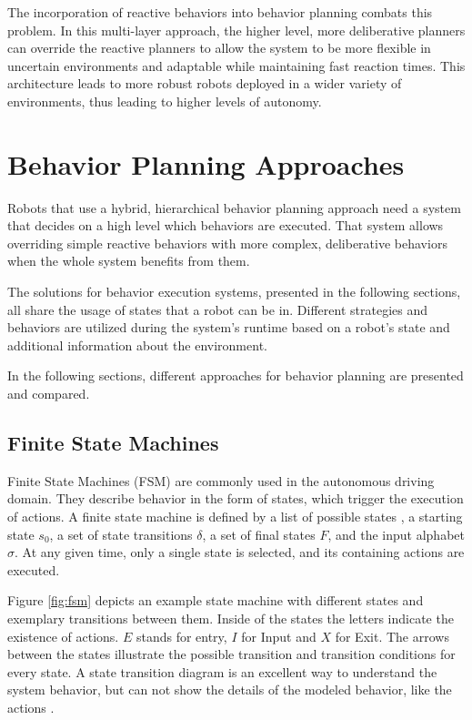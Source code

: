 The incorporation of reactive behaviors into behavior planning combats this problem. In this multi-layer approach, the higher level, more deliberative planners can override the reactive planners to allow the system to be more flexible in uncertain environments and adaptable while maintaining fast reaction times. This architecture leads to more robust robots deployed in a wider variety of environments, thus leading to higher levels of autonomy.

\section{Behavior Planning Approaches}
\label{sec:Behavior Planning Approaches}

Robots that use a hybrid, hierarchical behavior planning approach need a system that decides on a high level which behaviors are executed. That system allows overriding simple reactive behaviors with more complex, deliberative behaviors when the whole system benefits from them. 

The solutions for behavior execution systems, presented in the following sections, all share the usage of states that a robot can be in. Different strategies and behaviors are utilized during the system's runtime based on a robot's state and additional information about the environment. 
 
In the following sections, different approaches for behavior planning are presented and compared.

\subsection{Finite State Machines}

Finite State Machines (FSM) are commonly used in the autonomous driving domain. They describe behavior in the form of states, which trigger the execution of actions. A finite state machine is defined by a list of possible states \textit{}, a starting state $s_{0}$, a set of state transitions $\delta$, a set of final states $F$, and the input alphabet $\sigma$. At any given time, only a single state is selected, and its containing actions are executed. 

Figure \ref{fig:fsm} depicts an example state machine with different states and exemplary transitions between them. Inside of the states the letters indicate the existence of actions. $E$ stands for entry, $I$ for Input and $X$ for Exit. The arrows between the states illustrate the possible transition and transition conditions for every state. A state transition diagram is an excellent way to understand the system behavior, but can not show the details of the modeled behavior, like the actions \cite{wagner2006}. 

